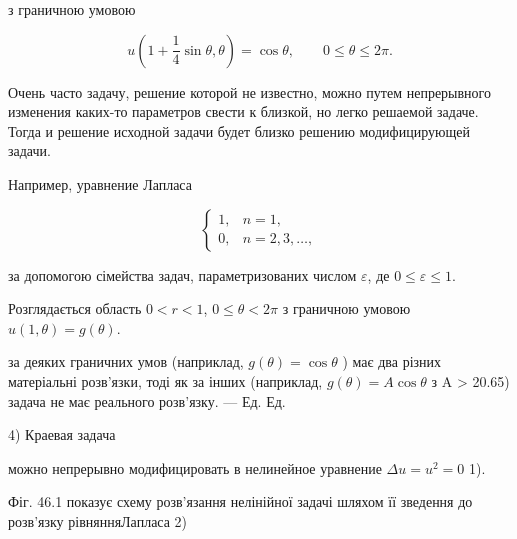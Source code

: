 \documentclass[
  ukrainian,
]{article}
\begin{document}
з граничною умовою

\[
u\!\left(1+\frac{1}{4}\sin\theta,\theta\right)=\cos\theta, \qquad 0 \le \theta \le 2\pi.
\]

Очень часто задачу, решение которой не известно, можно путем
непрерывного изменения каких-то параметров свести к близкой, но легко
решаемой задаче. Тогда и решение исходной задачи будет близко решению
модифицирующей задачи.

Например, уравнение Лапласа

\[
\begin{cases} 1, & n = 1, \\ 0, & n = 2, 3, \dots, \end{cases}
\]

за допомогою сімейства задач, параметризованих числом \(\varepsilon\),
де \(0 \le \varepsilon \le 1\).

Розглядається область \(0 < r < 1\), \(0 \le \theta < 2\pi\) з граничною
умовою \(u(1,\theta)=g(\theta)\).

за деяких граничних умов (наприклад, \(g(\theta) = \cos \theta\) ) має
два різних матеріальні розв'язки, тоді як за інших (наприклад,
\(g(\theta) = A \cos \theta\) з A \textgreater{} 20.65) задача не має
реального розв'язку. --- Ед. Ед.

4) Краевая задача

можно непрерывно модифицировать в нелинейное уравнение
\(\Delta u = u^2 = 0\) 1).

Фіг. 46.1 показує схему розв'язання нелінійної задачі шляхом її зведення
до розв'язку рівнянняЛапласа 2)
\end{document}
